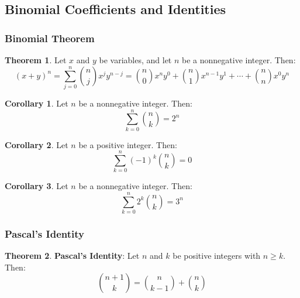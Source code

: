\documentclass[article, 11pt]{article}
\theoremstyle{definition}
\newtheorem{theorem}{Theorem}[subsubsection]
\newtheorem{corollary}{Corollary}[subsubsection]
\begin{document}
    \subsection{Binomial Coefficients and Identities}
    \subsubsection{Binomial Theorem}
    \begin{theorem}
        Let $x$ and $y$ be variables, and let $n$ be a nonnegative integer. Then:
        \begin{equation*}
            (x+y)^n = \sum_{j=0}^n \binom{n}{j}x^jy^{n-j} = \binom{n}{0}x^ny^0 + \binom{n}{1}x^{n-1}y^1 + \cdots + \binom{n}{n}x^0y^n
        \end{equation*}
    \end{theorem}
    \begin{corollary}
        Let $n$ be a nonnegative integer. Then:
        \begin{equation*}
            \sum_{k=0}^n \binom{n}{k} = 2^n
        \end{equation*}        
    \end{corollary}
    \begin{corollary}
        Let $n$ be a positive integer. Then:
        \begin{equation*}
            \sum_{k=0}^n (-1)^k \binom{n}{k} = 0
        \end{equation*}
    \end{corollary}
    \begin{corollary}
        Let $n$ be a nonnegative integer. Then:
        \begin{equation*}
            \sum_{k=0}^n 2^k \binom{n}{k} = 3^n
        \end{equation*}
    \end{corollary}
    \subsubsection{Pascal's Identity}
    \begin{theorem}
        \textbf{Pascal's Identity}: Let $n$ and $k$ be positive integers with $n \geq k$. Then:
        \begin{equation*}
            \binom{n+1}{k} = \binom{n}{k-1} + \binom{n}{k}
        \end{equation*}
    \end{theorem}
\end{document}
